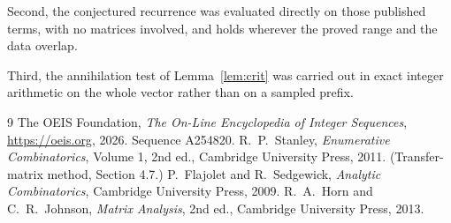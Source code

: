 \documentclass[11pt,a4paper]{article}
\theoremstyle{plain}
\theoremstyle{definition}
\begin{document}
Second, the conjectured recurrence was evaluated directly on those published terms, with no
matrices involved, and holds wherever the proved range and the data overlap.

Third, the annihilation test of Lemma~\ref{lem:crit} was carried out in exact integer
arithmetic on the whole vector rather than on a sampled prefix.

\begin{thebibliography}{9}
 The OEIS Foundation, \emph{The On-Line Encyclopedia of Integer
Sequences}, \url{https://oeis.org}, 2026. Sequence A254820.
 R.~P.~Stanley, \emph{Enumerative Combinatorics}, Volume 1, 2nd ed.,
Cambridge University Press, 2011. (Transfer-matrix method, Section 4.7.)
 P.~Flajolet and R.~Sedgewick, \emph{Analytic Combinatorics}, Cambridge
University Press, 2009.
 R.~A.~Horn and C.~R.~Johnson, \emph{Matrix Analysis}, 2nd ed., Cambridge
University Press, 2013.
\end{thebibliography}
\end{document}
